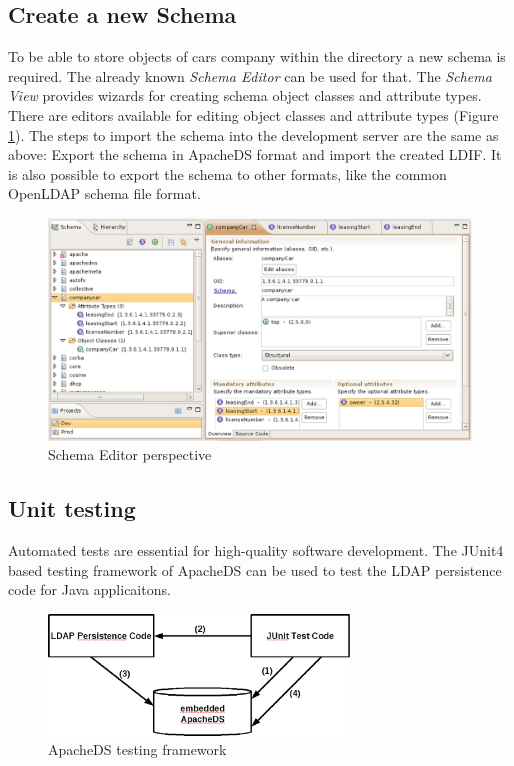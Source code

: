 \documentclass[a4paper,11pt,oneside]{article}
\begin{document}
\subsection{Create a new Schema}
To be able to store objects of cars company within the directory a new schema is required. The already known \textit{Schema Editor} can be used for that. The \textit{Schema View} provides wizards for creating schema object classes and attribute types. There are editors available for editing object classes and attribute types (Figure \ref{Schema Editor perspective}). The steps to import the schema into the development server are the same as above: Export the schema in ApacheDS format and import the created LDIF. It is also possible to export the schema to other formats, like the common OpenLDAP schema file format.

\begin{figure}[htb]
  \begin{center}
  \includegraphics[width=12cm]{images/06_schema_editor.eps}
  \end{center}
  \caption{Schema Editor perspective}
  \label{Schema Editor perspective}
\end{figure}

\subsection{Unit testing}
Automated tests are essential for high-quality software development. The JUnit4 based testing framework of ApacheDS can be used to test the LDAP persistence code for Java applicaitons.

\begin{figure}[htb]
  \begin{center}
  \includegraphics[width=8cm]{images/08_junit.eps}
  \end{center}
  \caption{ApacheDS testing framework}
  \label{ApacheDS testing framework}
\end{figure}
\end{document}
